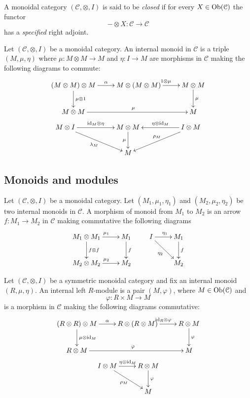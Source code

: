 \begin{refsection}
\begin{defin}
A monoidal category $(\mathcal C, \otimes, I)$ is said to be \emph{closed} if for every $X \in \operatorname{Ob}(\mathcal C)$ the functor
\[
- \otimes X \colon \mathcal C \to \mathcal C
\]
has a \emph{specified} right adjoint.
\end{defin}

\begin{defin}
Let $(\mathcal C, \otimes, I)$ be a monoidal category. An internal monoid in $\mathcal C$ is a triple $(M, \mu, \eta)$ where $\mu \colon M \otimes M \to M$ and $\eta \colon I \to M$ are morphisms in $\mathcal C$ making the following diagrams to commute:
\begin{gather*}
\xymatrix{
(M \otimes M) \otimes M \ar[r]^{\alpha} \ar[d]^-{\mu \otimes 1} & M \otimes (M \otimes M) \ar[r]^{1 \otimes \mu} & M \otimes M \ar[d]^{\mu} \\ M \otimes M \ar[rr]^\mu & & M
} \\
\xymatrix{
M \otimes I \ar[drr]_{\lambda_M} \ar[rr]^-{\mathrm{id}_M \otimes \eta} & & M \otimes M \ar[d]_\mu & & I \otimes M \ar[ll]_-{\eta \otimes \mathrm{id}_M} \ar[dll]_{\rho_M} \\
& & M
}
\end{gather*}
\end{defin}

\subsection{Monoids and modules}

\begin{defin}
Let $(\mathcal C, \otimes, I)$ be a monoidal category. Let $(M_1, \mu_1, \eta_1)$ and $(M_2, \mu_2, \eta_2)$ be two internal monoids in $\mathcal C$. A morphism of monoid from $M_1$ to $M_2$ is an arrow $f \colon M_1 \to M_2$ in $\mathcal C$ making commutative the following diagrams
\[
\xymatrix{
M_1 \otimes M_1 \ar[r]^{\mu_1} \ar[d]^{f \otimes f} & M_1 \ar[d]^f \\ M_2 \otimes M_2 \ar[r]^{\mu_2} & M_2
} \qquad
\xymatrix{
I \ar[r]^{\eta_1} \ar[dr]_{\eta_2} & M_1 \ar[d]^f \\ & M_2
}
\]
\end{defin}

\begin{defin}
Let $(\mathcal C, \otimes, I)$ be a symmetric monoidal category and fix an internal monoid $(R, \mu, \eta)$. An internal left $R$-module is a pair $(M, \varphi)$, where $M \in \operatorname{Ob}(\mathcal C)$ and
\[
\varphi \colon R \times M \to M
\]
is a morphism in $\mathcal C$ making the following diagrams commutative:
\begin{gather*}
\xymatrix{
(R \otimes R) \otimes M \ar[r]^{\alpha} \ar[d]^-{\mu \otimes \mathrm{id}_M} & R \otimes (R \otimes M) \ar[r]^{\mathrm{id}_R \otimes \varphi} & R \otimes M \ar[d]^{\varphi} \\
R \otimes M \ar[rr]^{\varphi} & & M
} \\
\xymatrix{
I \otimes M \ar[r]^{\eta \otimes \mathrm{id}_M} \ar[dr]_{\rho_M} & R \otimes M \ar[d]^\varphi \\ & M
}
\end{gather*}
\end{defin}


\end{refsection}
